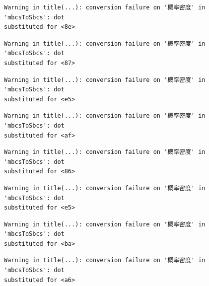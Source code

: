 \documentclass[
  letterpaper,
  DIV=11,
  numbers=noendperiod]{scrreprt}
\begin{document}
\begin{verbatim}
Warning in title(...): conversion failure on '概率密度' in 'mbcsToSbcs': dot
substituted for <8e>
\end{verbatim}

\begin{verbatim}
Warning in title(...): conversion failure on '概率密度' in 'mbcsToSbcs': dot
substituted for <87>
\end{verbatim}

\begin{verbatim}
Warning in title(...): conversion failure on '概率密度' in 'mbcsToSbcs': dot
substituted for <e5>
\end{verbatim}

\begin{verbatim}
Warning in title(...): conversion failure on '概率密度' in 'mbcsToSbcs': dot
substituted for <af>
\end{verbatim}

\begin{verbatim}
Warning in title(...): conversion failure on '概率密度' in 'mbcsToSbcs': dot
substituted for <86>
\end{verbatim}

\begin{verbatim}
Warning in title(...): conversion failure on '概率密度' in 'mbcsToSbcs': dot
substituted for <e5>
\end{verbatim}

\begin{verbatim}
Warning in title(...): conversion failure on '概率密度' in 'mbcsToSbcs': dot
substituted for <ba>
\end{verbatim}

\begin{verbatim}
Warning in title(...): conversion failure on '概率密度' in 'mbcsToSbcs': dot
substituted for <a6>
\end{verbatim}
\end{document}

